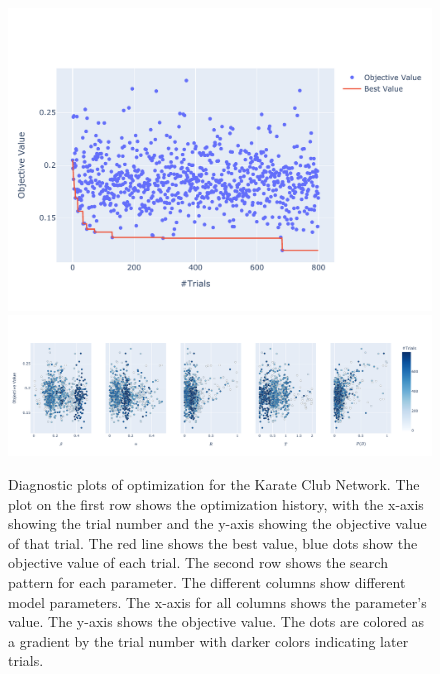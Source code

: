 \documentclass[11pt]{article}
\begin{document}
\begin{figure}[H]
    \centering
    \includegraphics[width=.7\linewidth]{../plots/overall/Optimization_History_karate.pdf}
    \includegraphics[width=.7\linewidth]{../plots/overall/Plot_Slice_karate.pdf}
  \caption{Diagnostic plots of optimization for the Karate Club Network. The plot on the first row shows the optimization history, with the x-axis showing the trial number and the y-axis showing the objective value of that trial. The red line shows the best value, blue dots show the objective value of each trial. The second row shows the search pattern for each parameter. The different columns show different model parameters. The x-axis for all columns shows the parameter's value. The y-axis shows the objective value. The dots are colored as a gradient by the trial number with darker colors indicating later trials.}
  \label{appendix:optimization_karate}
\end{figure}
\end{document}
